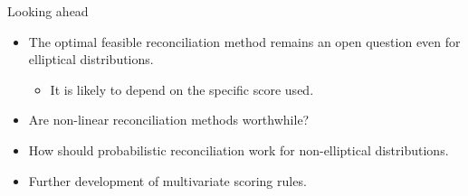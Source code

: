 \documentclass[handout]{beamer}
\begin{document}
   \begin{frame}{Looking ahead}
     \begin{itemize}
     	\item The optimal feasible reconciliation method remains an open question even for elliptical distributions.
     	\begin{itemize}
     		\item It is likely to depend on the specific score used.
     	\end{itemize}
        \item Are non-linear reconciliation methods worthwhile?
        \item How should probabilistic reconciliation work for non-elliptical distributions.
        \item Further development of multivariate scoring rules.
     \end{itemize}	
   \end{frame}
\end{document}
